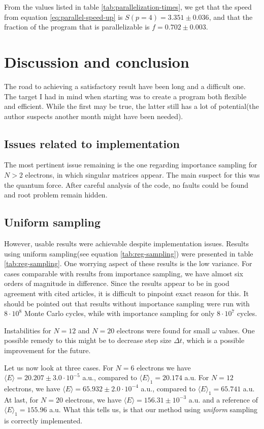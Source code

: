 \documentclass[11pt]{article}
\begin{document}
From the values listed in table \ref{tab:parallelization-times}, we get that the speed from equation \eqref{eq:parallel-speed-up} is $S(p=4) = 3.351 \pm 0.036$, and that the fraction of the program that is parallelizable is $f = 0.702 \pm 0.003$.




\section{Discussion and conclusion}
The road to achieving a satisfactory result have been long and a difficult one. The target I had in mind when starting was to create a program both flexible and efficient. While the first may be true, the latter still has a lot of potential(the author suspects another month might have been needed). 

\subsection{Issues related to implementation}
The most pertinent issue remaining is the one regarding importance sampling for $N > 2$ electrons, in which singular matrices appear. The main suspect for this was the quantum force. After careful analysis of the code, no faults could be found and root problem remain hidden.

\subsection{Uniform sampling}
However, usable results were achievable despite implementation issues. Results using uniform sampling(see equation \eqref{tab:reg-sampling}) were presented in table \ref{tab:reg-sampling}. One worrying aspect of these results is the low variance. For cases comparable with results from importance sampling, we have almost six orders of magnitude in difference. Since the results appear to be in good agreement with cited articles, it is difficult to pinpoint exact reason for this. It should be pointed out that results without importance sampling were run with $8\cdot 10^8$ Monte Carlo cycles, while with importance sampling for only $8\cdot 10^7$ cycles. 

Instabilities for $N=12$ and $N=20$ electrons were found for small $\omega$ values. One possible remedy to this might be to decrease step size $\Delta t$, which is a possible improvement for the future.

Let us now look at three cases. For $N=6$ electrons we have $\langle E \rangle = 20.207\pm 3.0\cdot 10^{-5}$ a.u., compared to $\langle E \rangle_1 = 20.174$ a.u. For $N=12$ electrons, we have $\langle E \rangle = 65.932\pm 2.0\cdot 10^{-4}$ a.u., compared to $\langle E \rangle_1=65.741$ a.u. At last, for $N=20$ electrons, we have $\langle E \rangle = 156.31\pm 10^{-3}$ a.u. and a reference of $\langle E \rangle_1 = 155.96$ a.u. What this tells us, is that our method using \textit{uniform} sampling is correctly implemented.
\end{document}
